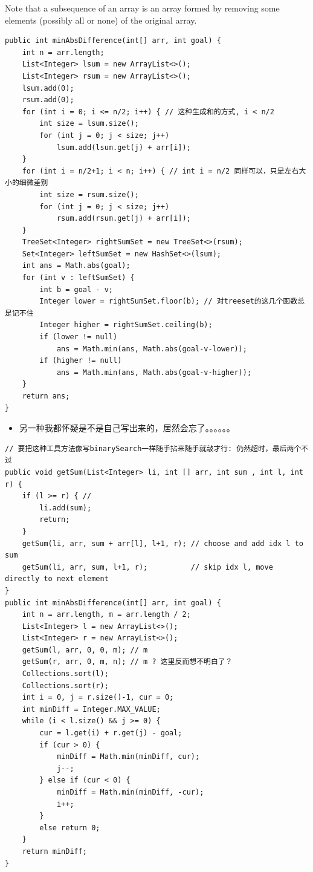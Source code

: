 \documentclass[9pt, b5paaper]{book}
\begin{document}
Note that a subsequence of an array is an array formed by removing some elements (possibly all or none) of the original array.
\begin{verbatim}
public int minAbsDifference(int[] arr, int goal) {
    int n = arr.length;
    List<Integer> lsum = new ArrayList<>();
    List<Integer> rsum = new ArrayList<>();
    lsum.add(0);
    rsum.add(0);
    for (int i = 0; i <= n/2; i++) { // 这种生成和的方式, i < n/2
        int size = lsum.size();
        for (int j = 0; j < size; j++) 
            lsum.add(lsum.get(j) + arr[i]);
    }
    for (int i = n/2+1; i < n; i++) { // int i = n/2 同样可以，只是左右大小的细微差别
        int size = rsum.size();
        for (int j = 0; j < size; j++) 
            rsum.add(rsum.get(j) + arr[i]);
    }
    TreeSet<Integer> rightSumSet = new TreeSet<>(rsum);
    Set<Integer> leftSumSet = new HashSet<>(lsum);
    int ans = Math.abs(goal);
    for (int v : leftSumSet) {
        int b = goal - v;
        Integer lower = rightSumSet.floor(b); // 对treeset的这几个函数总是记不住
        Integer higher = rightSumSet.ceiling(b);
        if (lower != null)
            ans = Math.min(ans, Math.abs(goal-v-lower));
        if (higher != null)
            ans = Math.min(ans, Math.abs(goal-v-higher));
    }
    return ans;
}
\end{verbatim}
\begin{itemize}
\item 另一种我都怀疑是不是自己写出来的，居然会忘了。。。。。。
\end{itemize}
\begin{verbatim}
// 要把这种工具方法像写binarySearch一样随手拈来随手就敲才行: 仍然超时，最后两个不过
public void getSum(List<Integer> li, int [] arr, int sum , int l, int r) {
    if (l >= r) { //
        li.add(sum);
        return;
    }
    getSum(li, arr, sum + arr[l], l+1, r); // choose and add idx l to sum
    getSum(li, arr, sum, l+1, r);          // skip idx l, move directly to next element
}
public int minAbsDifference(int[] arr, int goal) {
    int n = arr.length, m = arr.length / 2;
    List<Integer> l = new ArrayList<>();
    List<Integer> r = new ArrayList<>();
    getSum(l, arr, 0, 0, m); // m 
    getSum(r, arr, 0, m, n); // m ? 这里反而想不明白了？
    Collections.sort(l);
    Collections.sort(r);
    int i = 0, j = r.size()-1, cur = 0;
    int minDiff = Integer.MAX_VALUE;
    while (i < l.size() && j >= 0) {
        cur = l.get(i) + r.get(j) - goal;
        if (cur > 0) {
            minDiff = Math.min(minDiff, cur);
            j--;
        } else if (cur < 0) {
            minDiff = Math.min(minDiff, -cur);
            i++;
        }
        else return 0;
    }
    return minDiff;
}
\end{verbatim}
\end{document}

